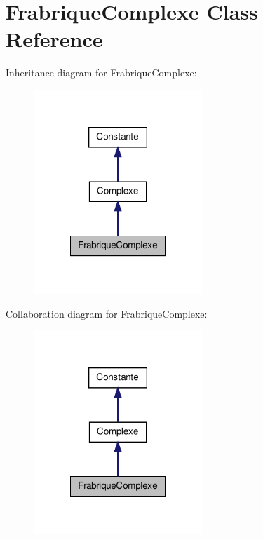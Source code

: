 \hypertarget{class_frabrique_complexe}{\section{\-Frabrique\-Complexe \-Class \-Reference}
\label{class_frabrique_complexe}
}


\-Inheritance diagram for \-Frabrique\-Complexe\-:
\nopagebreak
\begin{figure}[H]
\begin{center}
\leavevmode
\includegraphics[width=180pt]{class_frabrique_complexe__inherit__graph}
\end{center}
\end{figure}


\-Collaboration diagram for \-Frabrique\-Complexe\-:
\nopagebreak
\begin{figure}[H]
\begin{center}
\leavevmode
\includegraphics[width=180pt]{class_frabrique_complexe__coll__graph}
\end{center}
\end{figure}
